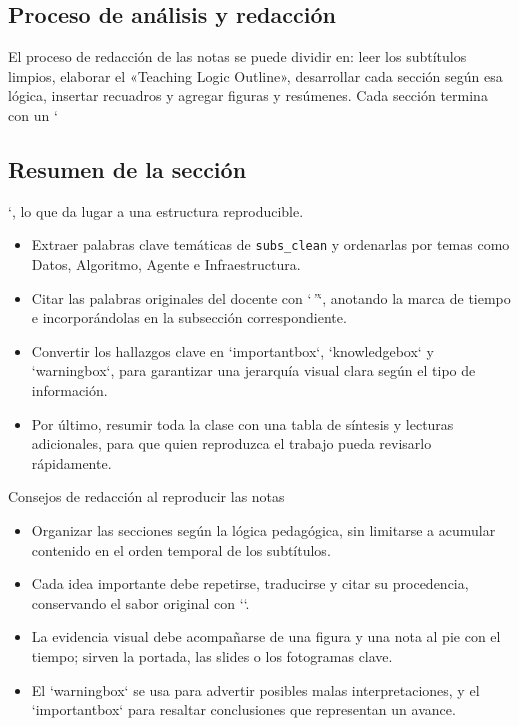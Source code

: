 \subsection{Proceso de análisis y redacción}
El proceso de redacción de las notas se puede dividir en: leer los subtítulos limpios, elaborar el «Teaching Logic Outline», desarrollar cada sección según esa lógica, insertar recuadros y agregar figuras y resúmenes. Cada sección termina con un `\subsection{Resumen de la sección}`, lo que da lugar a una estructura reproducible.
\begin{itemize}
    \item Extraer palabras clave temáticas de \texttt{subs\_clean} y ordenarlas por temas como Datos, Algoritmo, Agente e Infraestructura.
    \item Citar las palabras originales del docente con `\textit{''}`, anotando la marca de tiempo e incorporándolas en la subsección correspondiente.
    \item Convertir los hallazgos clave en `importantbox`, `knowledgebox` y `warningbox`, para garantizar una jerarquía visual clara según el tipo de información.
    \item Por último, resumir toda la clase con una tabla de síntesis y lecturas adicionales, para que quien reproduzca el trabajo pueda revisarlo rápidamente.
\end{itemize}
\begin{knowledgebox}{Consejos de redacción al reproducir las notas}
\begin{itemize}
    \item Organizar las secciones según la lógica pedagógica, sin limitarse a acumular contenido en el orden temporal de los subtítulos.
    \item Cada idea importante debe repetirse, traducirse y citar su procedencia, conservando el sabor original con `\textit{}`.
    \item La evidencia visual debe acompañarse de una figura y una nota al pie con el tiempo; sirven la portada, las slides o los fotogramas clave.
    \item El `warningbox` se usa para advertir posibles malas interpretaciones, y el `importantbox` para resaltar conclusiones que representan un avance.
\end{itemize}
\end{knowledgebox}

